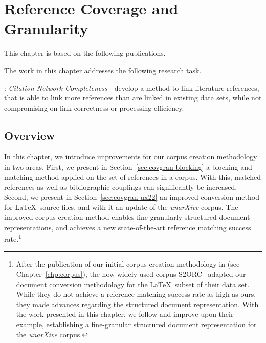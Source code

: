 \chapter{Reference Coverage and Granularity}
\label{chp:covgran}

This chapter is based on the following publications.
\begin{infobox-pub}
\end{infobox-pub}

\begin{infobox-pub}
\end{infobox-pub}

The work in this chapter addresses the following research task.

\begin{rtlist}
    \item[\rtmark{2}:] \textit{Citation Network Completeness} - develop a method to link literature references, that is able to link more references than are linked in existing data sets, while not compromising on link correctness or processing efficiency.
\end{rtlist}

\section{Overview}
In this chapter, we introduce improvements for our corpus creation methodology in two areas.
First, we present in Section~\ref{sec:covgran-blocking} a blocking and matching method applied on the set of references in a corpus. With this, matched references as well as bibliographic couplings can significantly be increased. %
Second, we present in Section~\ref{sec:covgran-ux22} an improved conversion method for \LaTeX\ source files, and with it an update of the \emph{unarXive} corpus. The improved corpus creation method enables fine-granularly structured document representations, and achieves a new state-of-the-art reference matching success rate.\footnote{After the publication of our initial corpus creation methodology in \cite{Saier2020} (see Chapter~\ref{chp:corpus}), the now widely used corpus S2ORC~\cite{Lo2020} adapted our document conversion methodology for the \LaTeX\ subset of their data set. While they do not achieve a reference matching success rate as high as ours, they made advances regarding the structured document representation. With the work presented in this chapter, we follow and improve upon their example, establishing a fine-granular structured document representation for the \emph{unarXive} corpus.}

